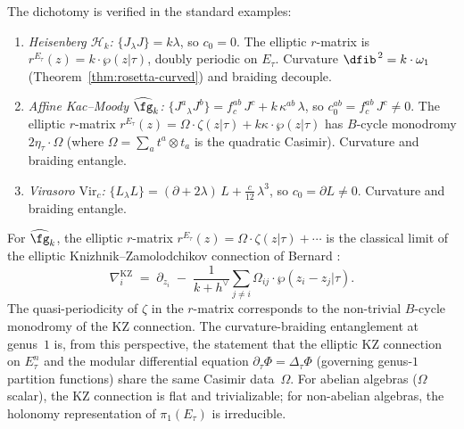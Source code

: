 \begin{remark}
The dichotomy is verified in the standard examples:
\begin{enumerate}[label=(\roman*)]
\item \emph{Heisenberg $\mathcal{H}_k$:}
 $\{J {}_\lambda J\} = k\lambda$, so $c_0 = 0$.
 The elliptic $r$-matrix is
 $r^{E_\tau}(z) = k \cdot \wp(z|\tau)$,
 doubly periodic on $E_\tau$. Curvature
 $\dfib^{\,2} = k \cdot \omega_1$
 (Theorem~\ref{thm:rosetta-curved}) and braiding decouple.

\item \emph{Affine Kac--Moody $\widehat{\fg}_k$:}
 $\{J^a {}_\lambda J^b\} = f^{ab}_c\, J^c +
 k\,\kappa^{ab}\,\lambda$,
 so $c_0^{ab} = f^{ab}_c\, J^c \ne 0$.
 The elliptic $r$-matrix
 $r^{E_\tau}(z) = \Omega \cdot \zeta(z|\tau) +
 k\kappa \cdot \wp(z|\tau)$
 has $B$-cycle monodromy $2\eta_\tau \cdot \Omega$
 (where $\Omega = \sum_a t^a \otimes t_a$ is the quadratic
 Casimir). Curvature and braiding entangle.

\item \emph{Virasoro $\mathrm{Vir}_c$:}
 $\{L {}_\lambda L\} = (\partial + 2\lambda)\,L +
 \tfrac{c}{12}\,\lambda^3$,
 so $c_0 = \partial L \ne 0$.
 Curvature and braiding entangle.
\end{enumerate}
\end{remark}

\begin{remark}
For $\widehat{\fg}_k$, the elliptic $r$-matrix
$r^{E_\tau}(z) = \Omega \cdot \zeta(z|\tau) + \cdots$
is the classical limit of the elliptic Knizhnik--Zamolodchikov
connection of Bernard \cite{Ber88}:
\[
\nabla_i^{\mathrm{KZ}}
\;=\;
\partial_{z_i}
\;-\;
\frac{1}{k + h^\vee}
\sum_{j \ne i}
 \Omega_{ij} \cdot \wp(z_i - z_j|\tau).
\]
The quasi-periodicity of $\zeta$ in the $r$-matrix
corresponds to the non-trivial $B$-cycle monodromy of
the KZ connection. The curvature-braiding entanglement
at genus~$1$ is, from this perspective, the statement
that the elliptic KZ connection on $E_\tau^n$ and the
modular differential equation
$\partial_\tau \Phi = \Delta_\tau \Phi$ (governing
genus-$1$ partition functions) share the same Casimir
data~$\Omega$. For abelian algebras ($\Omega$ scalar),
the KZ connection is flat and trivializable;
for non-abelian algebras, the holonomy representation
of $\pi_1(E_\tau)$ is irreducible.
\end{remark}

